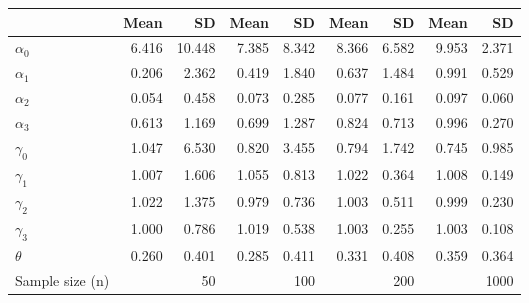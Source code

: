 
\begin{tabular}[t]{lrrrrrrrr}
\toprule
  & Mean & SD & Mean  & SD  & Mean   & SD   & Mean    & SD   \\
\midrule
$\alpha_{0}$ & 6.416 & 10.448 & 7.385 & 8.342 & 8.366 & 6.582 & 9.953 & 2.371\\
$\alpha_{1}$ & 0.206 & 2.362 & 0.419 & 1.840 & 0.637 & 1.484 & 0.991 & 0.529\\
$\alpha_{2}$ & 0.054 & 0.458 & 0.073 & 0.285 & 0.077 & 0.161 & 0.097 & 0.060\\
$\alpha_{3}$ & 0.613 & 1.169 & 0.699 & 1.287 & 0.824 & 0.713 & 0.996 & 0.270\\
$\gamma_{0}$ & 1.047 & 6.530 & 0.820 & 3.455 & 0.794 & 1.742 & 0.745 & 0.985\\
$\gamma_{1}$ & 1.007 & 1.606 & 1.055 & 0.813 & 1.022 & 0.364 & 1.008 & 0.149\\
$\gamma_{2}$ & 1.022 & 1.375 & 0.979 & 0.736 & 1.003 & 0.511 & 0.999 & 0.230\\
$\gamma_{3}$ & 1.000 & 0.786 & 1.019 & 0.538 & 1.003 & 0.255 & 1.003 & 0.108\\
$\theta$ & 0.260 & 0.401 & 0.285 & 0.411 & 0.331 & 0.408 & 0.359 & 0.364\\
Sample size (n) &  & 50 &  & 100 &  & 200 &  & 1000\\
\bottomrule
\end{tabular}
